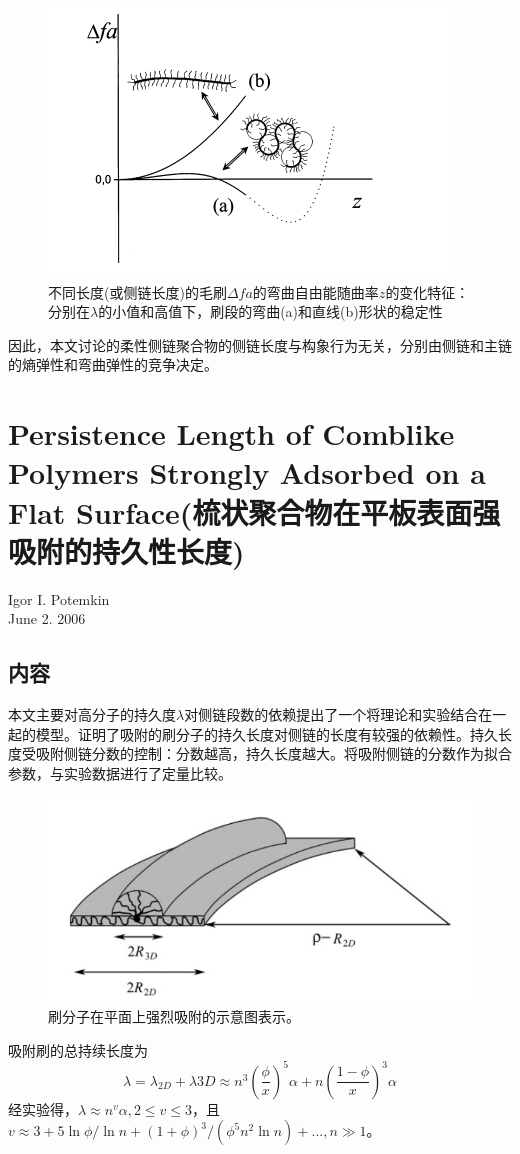 \documentclass[12pt,a4paper]{article}
\numberwithin{equation}{section}
\begin{document}
\begin{figure}[H]
\centering
\includegraphics[scale=0.7]{./figures/13.png}
\caption{不同长度(或侧链长度)的毛刷$\Delta fa$的弯曲自由能随曲率$z$的变化特征：分别在$\lambda$的小值和高值下，刷段的弯曲(a)和直线(b)形状的稳定性}
\end{figure}
因此，本文讨论的柔性侧链聚合物的侧链长度与构象行为无关，分别由侧链和主链的熵弹性和弯曲弹性的竞争决定。


\section{Persistence Length of Comblike Polymers Strongly Adsorbed on a Flat Surface(梳状聚合物在平板表面强吸附的持久性长度)}
\begin{center}
Igor I. Potemkin\\
June 2. 2006
\end{center}
\subsection{内容}
本文主要对高分子的持久度$\lambda$对侧链段数的依赖提出了一个将理论和实验结合在一起的模型。证明了吸附的刷分子的持久长度对侧链的长度有较强的依赖性。持久长度受吸附侧链分数的控制：分数越高，持久长度越大。将吸附侧链的分数作为拟合参数，与实验数据进行了定量比较。
\begin{figure}[H]
\centering
\includegraphics[scale=0.5]{./figures/4.png}
\caption{刷分子在平面上强烈吸附的示意图表示。}
\end{figure}
吸附刷的总持续长度为
\begin{equation}
\lambda=\lambda_{2D}+\lambda{3D}\approx n^3\left( \frac{\phi}{x} \right)^5\alpha +n\left( \frac{1-\phi}{x} \right)^3\alpha
\end{equation}		
经实验得，$\lambda \approx n^{v}\alpha,2\leq v \leq 3$，且$v\approx 3+5\ln \phi / \ln n+(1+\phi)^3/(\phi ^5 n^2 \ln n)+...,n\gg 1$。
\end{document}
